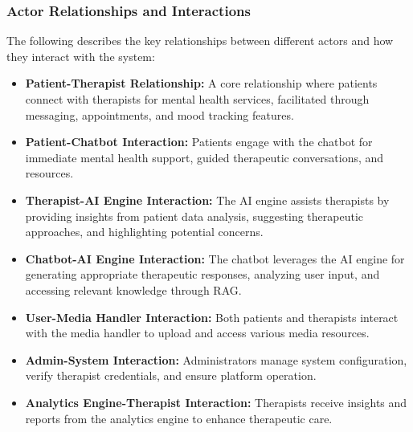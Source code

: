 \subsubsection{Actor Relationships and Interactions}
The following describes the key relationships between different actors and how they interact with the system:

\begin{itemize}
    \item \textbf{Patient-Therapist Relationship:} A core relationship where patients connect with therapists for mental health services, facilitated through messaging, appointments, and mood tracking features.
    
    \item \textbf{Patient-Chatbot Interaction:} Patients engage with the chatbot for immediate mental health support, guided therapeutic conversations, and resources.
    
    \item \textbf{Therapist-AI Engine Interaction:} The AI engine assists therapists by providing insights from patient data analysis, suggesting therapeutic approaches, and highlighting potential concerns.
    
    \item \textbf{Chatbot-AI Engine Interaction:} The chatbot leverages the AI engine for generating appropriate therapeutic responses, analyzing user input, and accessing relevant knowledge through RAG.
    
    \item \textbf{User-Media Handler Interaction:} Both patients and therapists interact with the media handler to upload and access various media resources.
    
    \item \textbf{Admin-System Interaction:} Administrators manage system configuration, verify therapist credentials, and ensure platform operation.
    
    \item \textbf{Analytics Engine-Therapist Interaction:} Therapists receive insights and reports from the analytics engine to enhance therapeutic care.
\end{itemize}

